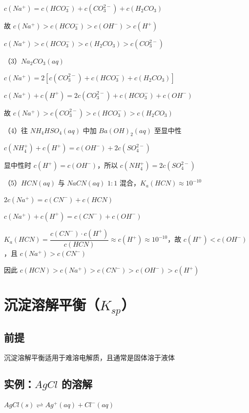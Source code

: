 \documentclass[UTF8,zihao=-4,openany]{ctexbook}
\begin{document}
$c(Na^+)=c(HCO_3^-)+c(CO_3^{2-})+c(H_2CO_3)$\par

故 $c(Na^+)>c(HCO_3^-)>c(OH^-)>c(H^+)$\par

$c(Na^+)>c(HCO_3^-)>c(H_2CO_3)>c(CO_3^{2-})$\par

\medskip
（3）$Na_2CO_3(aq)$\par

$c(Na^+)=2[c(CO_3^{2-})+c(HCO_3^-)+c(H_2CO_3)]$\par

$c(Na^+)+c(H^+)=2c(CO_3^{2-})+c(HCO_3^-)+c(OH^-)$\par

故 $c(Na^+)>c(CO_3^{2-})>c(HCO_3^-)>c(H_2CO_3)$\par

\medskip
（4）往 $NH_4HSO_4(aq)$ 中加 $Ba(OH)_2(aq)$ 至显中性\par

$c(NH_4^+)+c(H^+)=c(OH^-)+2c(SO_4^{2-})$\par

显中性时 $c(H^+)=c(OH^-)$，所以 $c(NH_4^+)=2c(SO_4^{2-})$\par

\medskip
（5）$HCN(aq)$ 与 $NaCN(aq)$ $1:1$ 混合，$K_a(HCN)\approx10^{-10}$\par

$2c(Na^+)=c(CN^-)+c(HCN)$\par

$c(Na^+)+c(H^+)=c(CN^-)+c(OH^-)$\par

$K_a(HCN)=\dfrac{c(CN^-)\cdot c(H^+)}{c(HCN)}\approx c(H^+)\approx10^{-10}$，故 $c(H^+)<c(OH^-)$，且 $c(Na^+)>c(CN^-)$\par

因此 $c(HCN)>c(Na^+)>c(CN^-)>c(OH^-)>c(H^+)$\par
\section{沉淀溶解平衡（$K_{sp}$）}
\subsection{前提}
沉淀溶解平衡适用于难溶电解质，且通常是固体溶于液体\par
\subsection{实例：$AgCl$ 的溶解}
$AgCl(s)\rightleftharpoons Ag^+(aq)+Cl^-(aq)$\par
\end{document}
